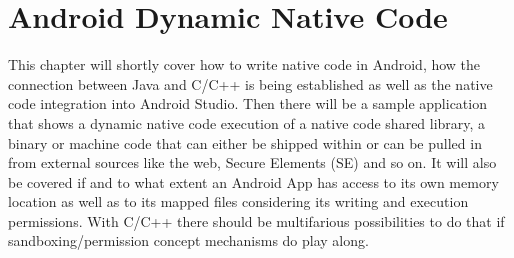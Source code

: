 \chapter{Android Dynamic Native Code}\label{chapter:android_dynamic_native_code}

This chapter will shortly cover how to write native code in Android, how
the connection between Java and C/C++ is being established as well as the
native code integration into Android Studio.
Then there will be a sample application that shows a dynamic native code execution of a native code shared library, a binary or machine code that can either be shipped within  or can be pulled in from external sources like the web, Secure Elements (SE) and so on. It will also be covered
if and to what extent an Android App has access to its own memory location as
well as to its mapped files considering its writing and execution permissions.
With C/C++ there should be multifarious possibilities to do that if sandboxing/permission concept mechanisms do play along.

